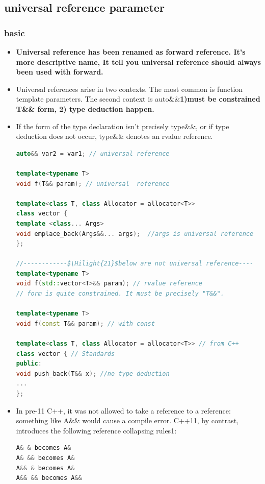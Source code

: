 \documentclass[a4paper,12pt,twoside]{book}
\newcommand{\Hilight}[1]{\makebox[0pt][l]{\color{yellow}\rule[-3pt]{#1em}{11pt}}}
\begin{document}
\subsection{universal reference parameter}

\subsubsection{basic}
\begin{itemize}
\item \textbf{Universal reference has been renamed as forward reference. It's more descriptive name, It tell you universal reference should always been used with forward.}

\item  Universal references arise in two contexts. The most common is function template parameters. The second context is auto\&\&\textbf{1)must be constrained T\&\& form, 2) type deduction happen.}

\item If the form of the type declaration isn't precisely type\&\&, or if type deduction does not occur, type\&\& denotes an rvalue reference.
\begin{lstlisting}[frame=single, language=c++, mathescape=true]
auto&& var2 = var1; // universal reference

template<typename T>
void f(T&& param); // universal  reference

template<class T, class Allocator = allocator<T>>
class vector {
template <class... Args>
void emplace_back(Args&&... args);  //args is universal reference
};

//------------$\Hilight{21}$below are not universal reference----
template<typename T>
void f(std::vector<T>&& param); // rvalue reference
// form is quite constrained. It must be precisely "T&&".

template<typename T>
void f(const T&& param); // with const

template<class T, class Allocator = allocator<T>> // from C++
class vector { // Standards
public:
void push_back(T&& x); //no type deduction
...
};
\end{lstlisting}


\item In pre-11 C++, it was not allowed to take a reference to a reference: something like A\&\& would cause a compile error. C++11, by contrast, introduces the following reference collapsing rules1:

\begin{lstlisting}[frame=single, language=c++]
A& & becomes A&
A& && becomes A&
A&& & becomes A&
A&& && becomes A&&
\end{lstlisting}


\end{itemize}
\end{document}
